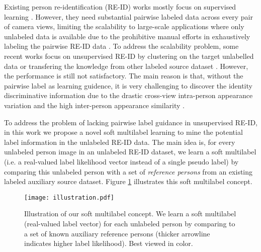 \documentclass[10pt,twocolumn,letterpaper]{article}
\begin{document}
Existing person re-identification (RE-ID) works mostly focus on supervised learning
\cite{2012_CVPR_KISSME,2015_CVPR_LOMO,2017_TPAMI_SALIENCE,2018_CVPR_camera-style,2015_CVPR_Ahmed,2016_CVPR_Wang,2016_CVPR_JSTL,
2016_ECCV_gated,2018_CVPR_mask-guided,2018_ECCV_PCB,2018_CVPR_pose-sensitive}.
However, they need substantial pairwise labeled data across every pair of camera views,
limiting the scalability to large-scale applications where only unlabeled data is available due to the prohibitive manual efforts
in exhaustively labeling the pairwise RE-ID data \cite{2015_TCSVT_xiaojuan}.
To address the scalability problem,
some recent works focus on unsupervised RE-ID
by clustering on the target unlabelled data \cite{2017_ICCV_asymmetric,2019_TPAMI_DECAMEL,2017_Arxiv_PUL} or transfering the knowledge from other labeled source dataset
\cite{2016_CVPR_tDIC,2018_CVPR_transferable,2018_CVPR_SPGAN,2018_ECCV_HHL}.
However, the performance is still not satisfactory.
The main reason is that, without the pairwise label as learning guidence,
it is very challenging to discover the identity discriminative information
due to the drastic cross-view intra-person appearance variation \cite{2017_ICCV_asymmetric}
and the high inter-person appearance similarity \cite{2013_TPAMI_RDC}.

To address the problem of lacking pairwise label guidance in unsupervised RE-ID,
in this work we propose a novel soft multilabel learning
to mine the potential label information in the unlabeled RE-ID data.
The main idea is,
for every unlabeled person image in an unlabeled RE-ID dataset,
we learn a soft multilabel (i.e. a real-valued
label likelihood vector instead of a single pseudo label) by
comparing this unlabeled person with a set of \emph{reference persons} from an existing labeled auxiliary source dataset.
Figure \ref{fig:illustration} illustrates this soft multilabel concept.


\begin{figure}[t]
\begin{center}
\texttt{[image: illustration.pdf]}
\end{center}
\vspace{-0.2cm}
   \caption{Illustration of our soft multilabel concept.
   We learn a soft multilabel (real-valued label vector) for each unlabeled person
   by comparing to a set of known auxiliary reference persons
   (thicker arrowline indicates higher label likelihood).
   Best viewed in color.}
\vspace{-0.4cm}
\label{fig:illustration}
\end{figure}
\end{document}
